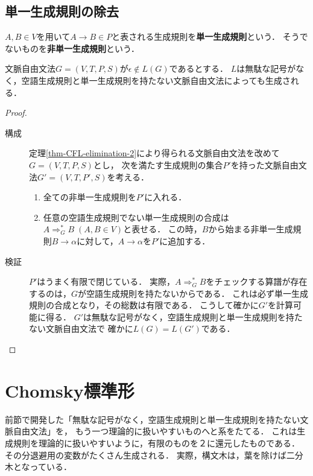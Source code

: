\subsection{単一生成規則の除去}

\begin{definition}
    $A,B\in V$を用いて$A\to B\in P$と表される生成規則を\textbf{単一生成規則}という．
    そうでないものを\textbf{非単一生成規則}という．
\end{definition}

\begin{theorem}\label{thm-CFL-elimination-3}
    文脈自由文法$G=(V,T,P,S)$が$\epsilon\notin L(G)$であるとする．
    $L$は無駄な記号がなく，空語生成規則と単一生成規則を持たない文脈自由文法によっても生成される．
\end{theorem}
\begin{proof}\mbox{}
    \begin{description}
        \item[構成] 
    定理\ref{thm-CFL-elimination-2}により得られる文脈自由文法を改めて$G=(V,T,P,S)$とし，
    次を満たす生成規則の集合$P'$を持った文脈自由文法$G'=(V,T,P',S)$を考える．
    \begin{enumerate}
        \item 全ての非単一生成規則を$P'$に入れる．
        \item 任意の空語生成規則でない単一生成規則の合成は$A\Rightarrow^*_G B\;(A,B\in V)$と表せる．
        この時，$B$から始まる非単一生成規則$B\to\alpha$に対して，$A\to\alpha$を$P'$に追加する．
    \end{enumerate}
        \item[検証] $P'$はうまく有限で閉じている．
    実際，$A\Rightarrow^*_GB$をチェックする算譜が存在するのは，$G$が空語生成規則を持たないからである．
    これは必ず単一生成規則の合成となり，その総数は有限である．
    こうして確かに$G'$を計算可能に得る．
    $G'$は無駄な記号がなく，空語生成規則と単一生成規則を持たない文脈自由文法で
    確かに$L(G)=L(G')$である．
    \end{description}
\end{proof}

\section{Chomsky標準形}

\begin{tcolorbox}[colframe=ForestGreen, colback=ForestGreen!10!white, breakable,
    title=二分木化(binarization)]
    前節で開発した「無駄な記号がなく，空語生成規則と単一生成規則を持たない文脈自由文法」を，
    もう一つ理論的に扱いやすいものへと系をたてる．
    これは生成規則を理論的に扱いやすいように，有限のものを２に還元したものである．
    その分退避用の変数がたくさん生成される．
    実際，構文木は，葉を除けば二分木となっている．
\end{tcolorbox}

